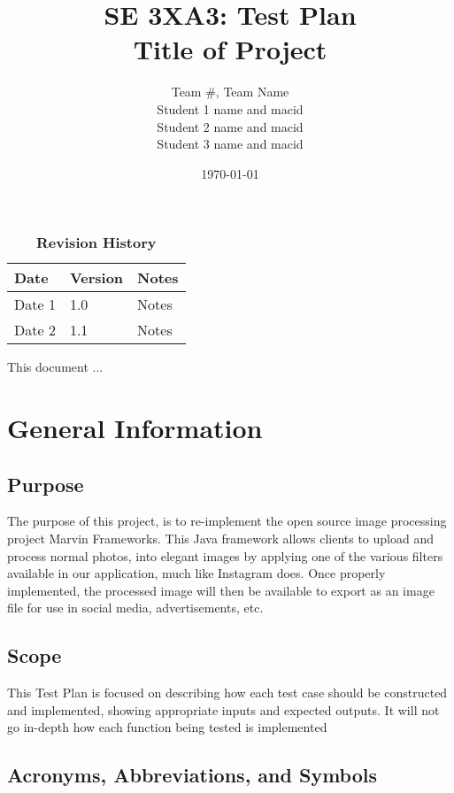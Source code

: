\documentclass[12pt, titlepage]{article}
\title{SE 3XA3: Test Plan\\Title of Project}
\author{Team \#, Team Name
		\\ Student 1 name and macid
		\\ Student 2 name and macid
		\\ Student 3 name and macid
}
\date{\today}
\begin{document}
\maketitle

\tableofcontents
\listoftables
\listoffigures

\begin{table}[bp]
\caption{\bf Revision History}
\begin{tabularx}{\textwidth}{p{3cm}p{2cm}X}
\toprule {\bf Date} & {\bf Version} & {\bf Notes}\\
\midrule
Date 1 & 1.0 & Notes\\
Date 2 & 1.1 & Notes\\
\bottomrule
\end{tabularx}
\end{table}

\newpage


This document ...

\section{General Information}

\subsection{Purpose}

The purpose of this project, is to re-implement the open source image processing project Marvin Frameworks. This Java framework allows clients to upload and process normal photos, into elegant images by applying one of the various filters available in our application, much like Instagram does. Once properly implemented, the processed image will then be available to export as an image file for use in social media, advertisements, etc.

\subsection{Scope}

This Test Plan is focused on describing how each test case should be constructed and implemented, showing appropriate inputs and expected outputs. It will not go in-depth how each function being tested is implemented

\subsection{Acronyms, Abbreviations, and Symbols}
	
\end{document}

